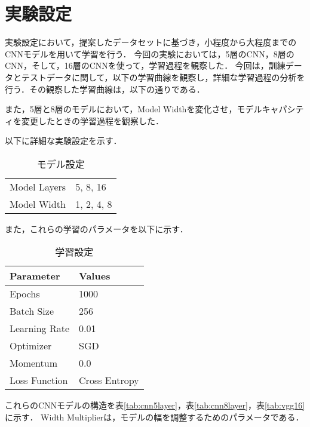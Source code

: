 \section{実験設定}
\label{sec:experiment_settings}
実験設定において，提案したデータセットに基づき，小程度から大程度までのCNNモデルを用いて学習を行う．
今回の実験においては，5層のCNN，8層のCNN，そして，16層のCNNを使って，学習過程を観察した．
今回は，訓練データとテストデータに関して，以下の学習曲線を観察し，詳細な学習過程の分析を行う．その観察した学習曲線は，以下の通りである．


また，5層と8層のモデルにおいて，Model Widthを変化させ，モデルキャパシティを変更したときの学習過程を観察した．

以下に詳細な実験設定を示す．

\begin{table}[ht]
    \centering
    \caption{モデル設定}
    \begin{tabular}{ll}
        \midrule
        Model Layers & 5, 8, 16 \\
        Model Width & 1, 2, 4, 8 \\
        \bottomrule
    \end{tabular}
    \label{tab:model_settings}
\end{table}

また，これらの学習のパラメータを以下に示す．

\begin{table}[ht]
    \centering
    \caption{学習設定}
    \begin{tabular}{ll}
        \toprule
        \textbf{Parameter} & \textbf{Values} \\
        \midrule
        Epochs & 1000 \\
        Batch Size & 256 \\
        Learning Rate & 0.01 \\
        Optimizer & SGD \\
        Momentum & 0.0 \\
        Loss Function & Cross Entropy \\
        \bottomrule
    \end{tabular}
    \label{tab:training_settings}
\end{table}

これらのCNNモデルの構造を表\ref{tab:cnn5layer}，表\ref{tab:cnn8layer}，表\ref{tab:vgg16}に示す．
Width Multiplierは，モデルの幅を調整するためのパラメータである．

